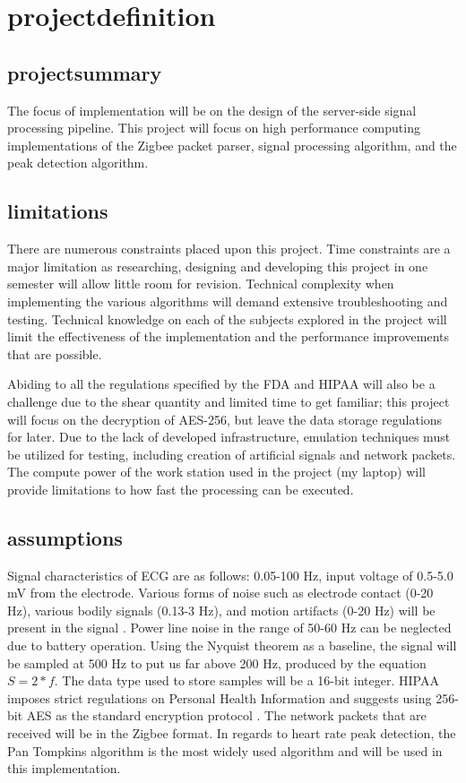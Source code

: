 \documentclass{article}
\begin{document}
\newpage
\section{\gls{projectdefinition}}
\subsection{\gls{projectsummary}}
The focus of implementation will be on the design of the server-side signal processing pipeline. This project will focus on high performance computing implementations of the Zigbee packet parser, signal processing algorithm, and the peak detection algorithm.
\subsection{\gls{limitations}}
There are numerous constraints placed upon this project. Time constraints are a major limitation as researching, designing and developing this project in one semester will allow little room for revision. Technical complexity when implementing the various algorithms will demand extensive troubleshooting and testing. Technical knowledge on each of the subjects explored in the project will limit the effectiveness of the implementation and the performance improvements that are possible. 

Abiding to all the regulations specified by the FDA and HIPAA will also be a challenge due to the shear quantity and limited time to get familiar; this project will focus on the decryption of AES-256, but leave the data storage regulations for later. Due to the lack of developed infrastructure, emulation techniques must be utilized for testing, including creation of artificial signals and network packets. The compute power of the work station used in the project (my laptop) will provide limitations to how fast the processing can be executed. 
\subsection{\gls{assumptions}}
Signal characteristics of ECG are as follows: 0.05-100 Hz, input voltage of 0.5-5.0 mV from the electrode. Various forms of noise such as electrode contact (0-20 Hz), various bodily signals (0.13-3 Hz), and motion artifacts (0-20 Hz) will be present in the signal \cite{ecgfiltering}. Power line noise in the range of 50-60 Hz can be neglected due to battery operation. Using the Nyquist theorem as a baseline, the signal will be sampled at 500 Hz to put us far above 200 Hz, produced by the equation $S = 2 * f$. The data type used to store samples will be a 16-bit integer. HIPAA imposes strict regulations on Personal Health Information and suggests using 256-bit AES as the standard encryption protocol \cite{sprinto}. The network packets that are received will be in the Zigbee format. In regards to heart rate peak detection, the Pan Tompkins algorithm is the most widely used algorithm \cite{pantompkins} and will be used in this implementation.
\end{document}
